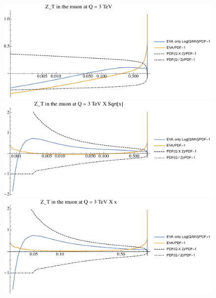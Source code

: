 \documentclass[a4paper,11pt]{article}
\begin{document}
\begin{figure}[ht]
\includegraphics[width=0.4\linewidth]{PlotPDFs/ratios/3TeV/Z_T_Q.pdf}
\includegraphics[width=0.4\linewidth]{PlotPDFs/ratios/3TeV/Z_T_Qsqrtx.pdf}
\includegraphics[width=0.4\linewidth]{PlotPDFs/ratios/3TeV/Z_T_Qx.pdf}
\end{figure}


%
\end{document}
